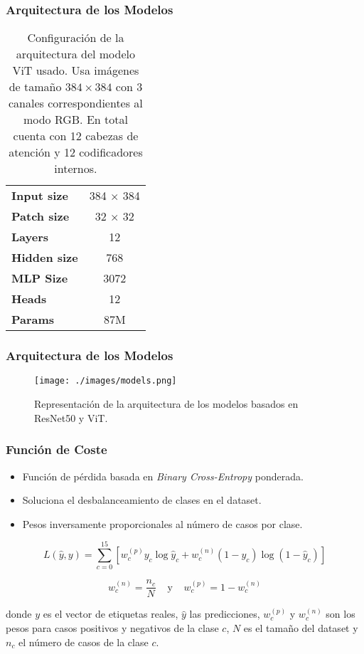 \begin{frame}
\frametitle{Arquitectura de los Modelos}
\begin{table}[!ht]
    \centering
    \begin{tabular}{| l | c |}
     \hline
    \textbf{Input size}  & 384 $\times$ 384 \\
    \textbf{Patch size}  & 32 $\times$ 32 \\
    \textbf{Layers}      & 12  \\
    \textbf{Hidden size} & 768 \\
    \textbf{MLP Size}    & 3072 \\
    \textbf{Heads}       & 12 \\
    \textbf{Params}      & 87M \\
     \hline
    \end{tabular}
    \caption{Configuración de la arquitectura del modelo ViT usado. Usa imágenes de tamaño
             $384 \times 384$ con 3 canales correspondientes al modo RGB. En total cuenta con 12
             cabezas de atención y 12 codificadores internos.}
\label{table_ViTBase}
\end{table}
\end{frame}

\begin{frame}
\frametitle{Arquitectura de los Modelos}
\begin{figure}[ht!]
    \centering
    \texttt{[image: ./images/models.png]}
    \caption{Representación de la arquitectura de los modelos basados en ResNet50 y ViT.}
\end{figure}
\end{frame}

\begin{frame}
\frametitle{Función de Coste}
\begin{itemize}
    \item Función de pérdida basada en \textit{Binary Cross-Entropy} ponderada.
    \item Soluciona el desbalanceamiento de clases en el dataset.
    \item Pesos inversamente proporcionales al número de casos por clase.
\end{itemize}

\begin{equation}
    L(\hat y, y) = \sum_{c=0}^{15} \left[ w_c^{(p)} y_c \log \hat y_c + w_c^{(n)} (1-y_c) \log (1- \hat y_c) \right]
\end{equation}

\begin{equation}
    w_c^{(n)} = \frac{n_c}{N} \;\;\;\; \text{y} \;\;\;\; w_c^{(p)} = 1-  w_c^{(n)}
\end{equation}

\small
donde $y$ es el vector de etiquetas reales, $\hat{y}$ las predicciones, $w_c^{(p)}$ y $w_c^{(n)}$ son los pesos para casos positivos y negativos de la clase $c$, $N$ es el tamaño del dataset y $n_c$ el número de casos de la clase $c$.
\end{frame}


